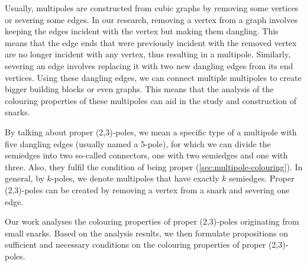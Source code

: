 Usually, multipoles are constructed from cubic graphs by removing some vertices or severing some edges. In our research, removing a vertex from a graph involves keeping the edges incident with the vertex but making them dangling. This means that the edge ends that were previously incident with the removed vertex are no longer incident with any vertex, thus resulting in a multipole. Similarly, severing an edge involves replacing it with two new dangling edges from its end vertices. Using these dangling edges, we can connect multiple multipoles to create bigger building blocks or even graphs. This means that the analysis of the colouring properties of these multipoles can aid in the study and construction of snarks.

By talking about proper (2,3)-poles, we mean a specific type of a multipole with five dangling edges (usually named a 5-pole), for which we can divide the semiedges into two so-called connectors, one with two semiedges and one with three. Also, they fulfil the condition of being proper (\cref{sec:multipole-colouring}). In general, by $k$-poles, we denote multipoles that have exactly $k$ semiedges. Proper (2,3)-poles can be created by removing a vertex from a snark and severing one edge.



Our work analyses the colouring properties of proper (2,3)-poles originating from small snarks. Based on the analysis results, we then formulate propositions on sufficient and necessary conditions on the colouring properties of proper (2,3)-poles. 

